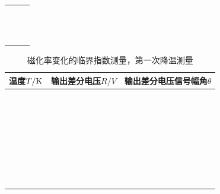 \documentclass[11pt,a4paper]{ctexart}
\begin{document}
\begin{enumerate}
\begin{table}[H]
\begin{tabular}{|p{32mm}|p{32mm}|p{32mm}|}
    & &\\ \hline
  & &\\ \hline
   & &\\ \hline
     &  &\\ \hline
  &  &\\ \hline
  &  &\\ \hline
  &  &\\ \hline
  &  &\\ \hline
  &  &\\ \hline
  &  &\\ \hline
  &  &\\ \hline
    & &\\ \hline
  & &\\ \hline
   & &\\ \hline
  \end{tabular}
  \end{table}
    \begin{table}[H]
\centering
\caption{磁化率变化的临界指数测量，第一次降温测量\label{tabley2}}
\begin{tabular}{|p{32mm}|p{32mm}|p{32mm}|}
\hline
温度$T/{\rm K}$ & 输出差分电压$R/{V}$ & 输出差分电压信号幅角$\theta$ \\ \hline
 & & \\ \hline
  & & \\ \hline
  & & \\ \hline
   & & \\ \hline
    & & \\ \hline
 & & \\ \hline
  &  &\\ \hline
  &  &\\ \hline
  &  &\\ \hline
  &  &\\ \hline
  &  &\\ \hline
  &  &\\ \hline
  &  &\\ \hline
  &  &\\ \hline
  &  &\\ \hline
  &  &\\ \hline
  &  &\\ \hline
  &  &\\ \hline
    & &\\ \hline
  & &\\ \hline
   & &\\ \hline
     &  &\\ \hline
  &  &\\ \hline
  &  &\\ \hline
  &  &\\ \hline
  &  &\\ \hline
  &  &\\ \hline
  &  &\\ \hline
  &  &\\ \hline
    & &\\ \hline
  & &\\ \hline
   & &\\ \hline
  \end{tabular}
  \end{table}
  

\end{enumerate}
\end{document}
